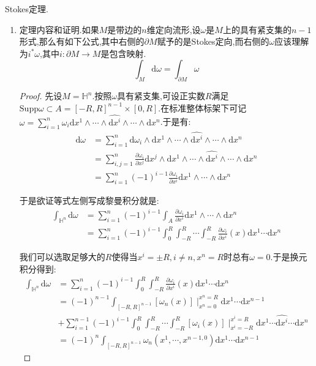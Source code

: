 Stokes定理.
\begin{enumerate}
	\item 定理内容和证明.如果$M$是带边的$n$维定向流形,设$\omega$是$M$上的具有紧支集的$n-1$形式,那么有如下公式,其中右侧的$\partial M$赋予的是Stokes定向,而右侧的$\omega$应该理解为$i^*\omega$,其中$i:\partial M\to M$是包含映射.
	$$\int_M\mathrm{d}\omega=\int_{\partial M}\omega$$
	\begin{proof}
		
		先设$M=\mathbb{H}^n$.按照$\omega$具有紧支集,可设正实数$R$满足$\mathrm{Supp}\omega\subset A=[-R,R]^{n-1}\times[0,R]$.在标准整体标架下可记$\omega=\sum_{i=1}^n\omega_i\mathrm{d}x^1\wedge\cdots\wedge\hat{\mathrm{d}x^i}\wedge\cdots\wedge\mathrm{d}x^n$.于是有:
		\begin{align*}
		\mathrm{d}\omega&=\sum_{i=1}^n\mathrm{d}\omega_i\wedge\mathrm{d}x^1\wedge\cdots\wedge\hat{\mathrm{d}x^i}\wedge\cdots\wedge\mathrm{d}x^n\\&=\sum_{i,j=1}^n\frac{\partial\omega_i}{\partial x^j}\mathrm{d}x^j\wedge\mathrm{d}x^1\wedge\cdots\wedge\hat{\mathrm{d}x^i}\wedge\cdots\wedge\mathrm{d}x^n\\&=\sum_{i=1}^n(-1)^{i-1}\frac{\partial\omega_i}{\partial x^i}\mathrm{d}x^1\wedge\cdots\wedge\mathrm{d}x^n
		\end{align*}
		
		于是欲证等式左侧写成黎曼积分就是:
		\begin{align*}
		\int_{\mathbb{H}^n}\mathrm{d}\omega&=\sum_{i=1}^n(-1)^{i-1}\int_A\frac{\partial\omega_i}{\partial x^i}\mathrm{d}x^1\wedge\cdots\wedge\mathrm{d}x^n\\&=\sum_{i=1}^n(-1)^{i-1}\int_0^R\int_{-R}^R\cdots\int_{-R}^R\frac{\partial\omega_i}{\partial x^i}(x)\mathrm{d}x^1\cdots\mathrm{d}x^n
		\end{align*}
		
		我们可以选取足够大的$R$使得当$x^i=\pm R,i\not=n,x^n=R$时总有$\omega=0$.于是换元积分得到:
		\begin{align*}
		\int_{\mathbb{H}^n}\mathrm{d}\omega&=\sum_{i=1}^n(-1)^{i-1}\int_0^R\int_{-R}^R\frac{\partial\omega_i}{\partial x^i}(x)\mathrm{d}x^1\cdots\mathrm{d}x^n\\&=(-1)^{n-1}\int_{[-R,R]^{n-1}}[\omega_n(x)]\mid^{x^n=R}_{x^n=0}\mathrm{d}x^1\cdots\mathrm{d}x^{n-1}\\&+\sum_{i=1}^{n-1}(-1)^{i-1}\int_0^R\int_{-R}^R\cdots\int_{-R}^R[\omega_i(x)]\mid^{x^i=R}_{x^i=-R}\mathrm{d}x^1\cdots\hat{\mathrm{d}x^i}\cdots\mathrm{d}x^n\\&=(-1)^n\int_{[-R,R]^{n-1}}\omega_n(x^1,\cdots,x^{n-1,0})\mathrm{d}x^1\cdots\mathrm{d}x^{n-1}
		\end{align*}
		

\end{proof}
\end{enumerate}
